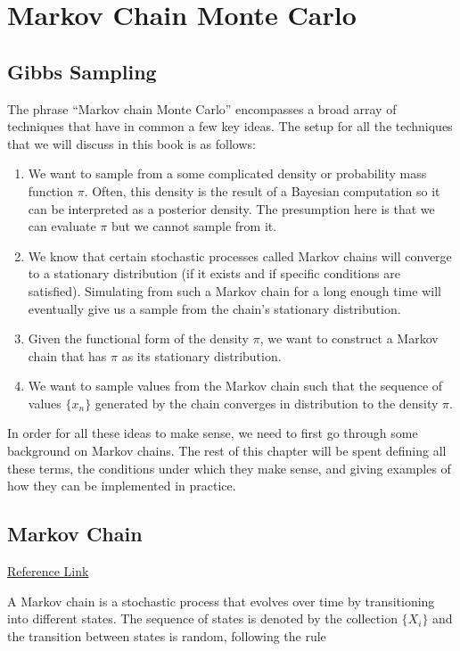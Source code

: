 \chapter{Markov Chain Monte Carlo}
\section{Gibbs Sampling}

The phrase ``Markov chain Monte Carlo'' encompasses a broad array of techniques that have in common a few key ideas. The setup for all the techniques that we will discuss in this book is as follows:

\begin{enumerate}
	\item We want to sample from a some complicated density or probability mass function $\pi$. Often, this density is the result of a Bayesian computation so it can be interpreted as a posterior density. The presumption here is that we can evaluate $\pi$ but we cannot sample from it.
	\item We know that certain stochastic processes called Markov chains will converge to a stationary distribution (if it exists and if specific conditions are satisfied). Simulating from such a Markov chain for a long enough time will eventually give us a sample from the chain’s stationary distribution.
	\item Given the functional form of the density $\pi$, we want to construct a Markov chain that has $\pi$ as its stationary distribution.
	\item We want to sample values from the Markov chain such that the sequence of values $\{x_n\}$ generated by the chain converges in distribution to the density $\pi$.
\end{enumerate}

In order for all these ideas to make sense, we need to first go through some background on Markov chains. The rest of this chapter will be spent defining all these terms, the conditions under which they make sense, and giving examples of how they can be implemented in practice.

\section{Markov Chain}
\href{https://gregorygundersen.com/blog/2019/10/28/ergodic-markov-chains/}{Reference Link}

A Markov chain is a stochastic process that evolves over time by transitioning into different states. The sequence of states is denoted by the collection $\{X_i\}$ and the transition between states is random, following the rule 


